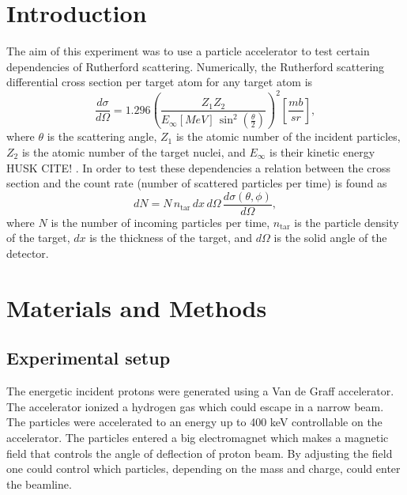 \documentclass[english,a4paper,twocolumn,amsmath,amssymb,floatfix]{revtex4-1}
\begin{document}
\section*{Introduction}
The aim of this experiment was to use a particle accelerator to test certain dependencies of Rutherford scattering. Numerically, the Rutherford scattering differential cross section per target atom for any target atom is
\begin{equation}
\frac{d\sigma}{d\Omega} = 1.296 \left( \frac{Z_1 Z_2}{E_\infty [MeV] \, \sin^2 \left(\frac{\theta}{2} \right) }\right)^2\left[\frac{mb}{sr}\right],
\end{equation}
where $\theta$ is the scattering angle, $Z_1$  is the atomic number of the incident particles, $Z_2$ is the atomic number of the target nuclei, and $E_{\infty}$ is their kinetic energy HUSK CITE!%
. 
In order to test these dependencies a relation between the cross section and the count rate (number of scattered particles per time) is found as
\begin{equation}
dN = N \, n_{\text{tar}} \, dx \,d\Omega \, \frac{d\sigma(\theta,\phi)}{d\Omega},
\end{equation}
where $N$ is the number of incoming particles per time, $n_\text{tar}$ is the particle density of the target, $dx$ is the thickness of the target, and $d\Omega$ is the solid angle of the detector.




\section*{Materials and Methods}

\subsection*{Experimental setup}
The energetic incident protons were generated using a Van de Graff accelerator. The accelerator ionized a hydrogen gas which could escape in a narrow beam. The particles were accelerated to an energy up to 400 keV controllable on the accelerator. The particles entered a big electromagnet which makes a magnetic field that controls the angle of deflection of proton beam. By adjusting the field one could control which particles, depending on the mass and charge, could enter the beamline. 

\end{document}
